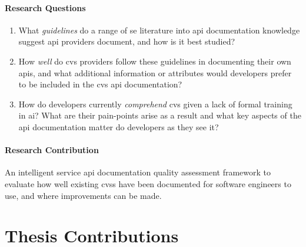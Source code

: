 \paragraph{Research Questions}
\begin{enumerate}[label=\textbf{RQ1.\arabic*.}, ref=RQ1.\arabic*, leftmargin=3.5\parindent, rightmargin=1\parindent]
  \item What \textit{guidelines} do a range of \gls{se} literature into \gls{api} documentation knowledge suggest \gls{api} providers document, and how is it best studied? 
  \label{rqs:apidoc:what-is-in-use}%
  
  \item How \textit{well} do \gls{cvs} providers follow these guidelines in documenting their own \glspl{api}, and what additional information or attributes would developers prefer to be included in the \gls{cvs} \gls{api} documentation? 
  \label{rqs:apidoc:what-additional-information-needed}%
 
  \item How do developers currently \textit{comprehend} \gls{cvs} given a lack of formal training in \gls{ai}? What are their pain-points arise as a result and what key aspects of the \gls{api} documentation matter do developers as they see it? %
  \label{rqs:apidoc:how-do-devs-understand-it}
\end{enumerate}

\paragraph{Research Contribution} An intelligent service \gls{api} documentation quality assessment framework to evaluate how well existing \glspl{cvs} have been documented for software engineers to use, and where improvements can be made.

\section{Thesis Contributions}

